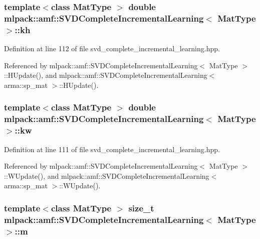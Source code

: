 \subsubsection[{kh}]{\setlength{\rightskip}{0pt plus 5cm}template$<$class Mat\-Type $>$ double {\bf mlpack\-::amf\-::\-S\-V\-D\-Complete\-Incremental\-Learning}$<$ Mat\-Type $>$\-::kh\hspace{0.3cm}{\ttfamily [private]}}\label{classmlpack_1_1amf_1_1SVDCompleteIncrementalLearning_a6f2796a3644ede16e69275122b1e70e9}


Definition at line 112 of file svd\-\_\-complete\-\_\-incremental\-\_\-learning.\-hpp.



Referenced by mlpack\-::amf\-::\-S\-V\-D\-Complete\-Incremental\-Learning$<$ Mat\-Type $>$\-::\-H\-Update(), and mlpack\-::amf\-::\-S\-V\-D\-Complete\-Incremental\-Learning$<$ arma\-::sp\-\_\-mat $>$\-::\-H\-Update().

\subsubsection[{kw}]{\setlength{\rightskip}{0pt plus 5cm}template$<$class Mat\-Type $>$ double {\bf mlpack\-::amf\-::\-S\-V\-D\-Complete\-Incremental\-Learning}$<$ Mat\-Type $>$\-::kw\hspace{0.3cm}{\ttfamily [private]}}\label{classmlpack_1_1amf_1_1SVDCompleteIncrementalLearning_a92d4cb28311a7b42063d2a16f86d3c86}


Definition at line 111 of file svd\-\_\-complete\-\_\-incremental\-\_\-learning.\-hpp.



Referenced by mlpack\-::amf\-::\-S\-V\-D\-Complete\-Incremental\-Learning$<$ Mat\-Type $>$\-::\-W\-Update(), and mlpack\-::amf\-::\-S\-V\-D\-Complete\-Incremental\-Learning$<$ arma\-::sp\-\_\-mat $>$\-::\-W\-Update().

\subsubsection[{m}]{\setlength{\rightskip}{0pt plus 5cm}template$<$class Mat\-Type $>$ size\-\_\-t {\bf mlpack\-::amf\-::\-S\-V\-D\-Complete\-Incremental\-Learning}$<$ Mat\-Type $>$\-::m\hspace{0.3cm}{\ttfamily [private]}}\label{classmlpack_1_1amf_1_1SVDCompleteIncrementalLearning_aacf90bb93f4f0ffb8277b29fc490ba49}


